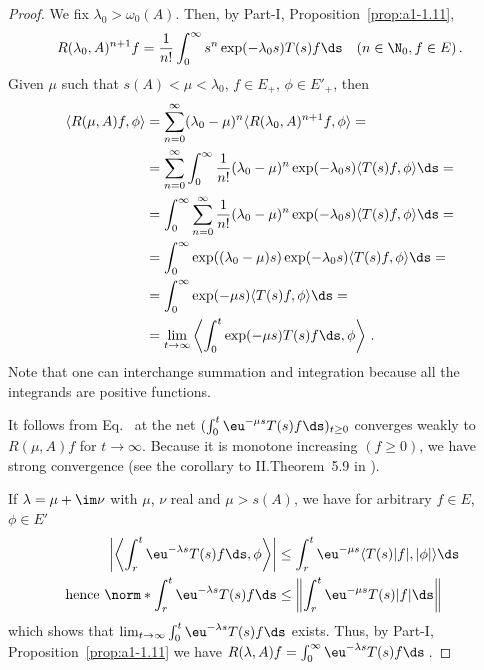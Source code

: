 \begin{proof}
	We fix $\lambda_{0} > \omega_0(A)$.
	Then, by Part-I, Proposition~\ref{prop:a1-1.11},
	\begin{equation}\label{eq:c3-1.2}
		R(\lambda_{0},A)^{n+1}f = \frac{1}{n!} \int_{0}^{\infty} s^n \exp(-\lambda_{0}s) T(s)f \ds  \quad (n \in \N_{0}, f \in E)\,.
	\end{equation}
	Given $\mu$ such that $s(A) < \mu < \lambda_{0}$, $f \in E_{+}$, $\phi \in E'_{+}$, then
	\begin{equation}\label{eq:c3-1.3}
    \begin{split}
		\langle R(\mu,A)f,\phi\rangle &= \sum_{n=0}^{\infty} (\lambda_{0}-\mu)^n\langle R(\lambda_{0},A)^{n+1}f,\phi\rangle = \\
		&= \sum_{n=0}^{\infty} \int_{0}^{\infty} \frac{1}{n!}(\lambda_{0}-\mu)^n\exp(-\lambda_{0}s)\langle T(s)f,\phi\rangle\ds = \\
		&= \int_{0}^{\infty} \sum_{n=0}^{\infty} \frac{1}{n!}(\lambda_{0}-\mu)^n\exp(-\lambda_{0}s)\langle T(s)f,\phi\rangle\ds = \\
		&= \int_{0}^{\infty} \exp((\lambda_{0}-\mu)s)\exp(-\lambda_{0}s)\langle T(s)f,\phi\rangle\ds = \\
		&= \int_{0}^{\infty} \exp(-\mu s)\langle T(s)f,\phi\rangle\ds = \\ & = \lim_{t\to\infty}\left\langle \int_{0}^t \exp(-\mu s)T(s)f \ds,\phi\right\rangle\,.
    \end{split}
	\end{equation}
	Note that one can interchange summation and integration because all the integrands are positive functions.
	
	It follows from Eq.~ at the net $(\int_{0}^t \eu^{-\mu s}T(s) f \ds )_{t\geq 0}$ converges weakly to $R(\mu,A)f$ for $t \to \infty$.
	Because it is monotone increasing $(f \geq 0)$, we have strong convergence (see the corollary to II.Theorem~5.9 in \textcite{schaefer:1974}).

If\/ $\lambda = \mu + \im\nu$ with $\mu$, $\nu$ real and $\mu > s(A)$, we have for arbitrary $f \in E$, $\phi \in E'$
\begin{align*}
	\left|\left\langle \int_{r}^t \eu^{-\lambda s}T(s)f \ds ,\phi\right\rangle\right| &\leq \int_{r}^t \eu^{-\mu s}\langle T(s)|f|,|\phi|\rangle\ds \\
	\text{ hence } \norm*{\int_{r}^t \eu^{-\lambda s}T(s)f \ds } &\leq \left\|\int_{r}^t \eu^{-\mu s}T(s)|f| \ds \right\| \
\end{align*}
which shows that $\lim_{t\to\infty} \int_{0}^t \eu^{-\lambda s}T(s)f \ds $ exists.
Thus, by  Part-I, Proposition~\ref{prop:a1-1.11} we have  $R(\lambda,A)f = \int_{0}^{\infty} \eu^{-\lambda s} T(s)f \ds $\,. 


\end{proof}
